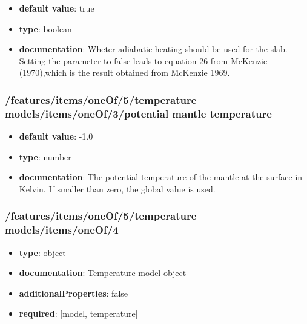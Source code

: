 \begin{itemize}\item {\bf default value}: true
\item {\bf type}: boolean
\item {\bf documentation}: Wheter adiabatic heating should be used for the slab. Setting the parameter to false leads to equation 26 from McKenzie (1970),which is the result obtained from McKenzie 1969.
\end{itemize}\subsubsection{/features/items/oneOf/5/temperature models/items/oneOf/3/potential mantle temperature}
\begin{itemize}\item {\bf default value}: -1.0
\item {\bf type}: number
\item {\bf documentation}: The potential temperature of the mantle at the surface in Kelvin. If smaller than zero, the global value is used.
\end{itemize}\subsubsection{/features/items/oneOf/5/temperature models/items/oneOf/4}
\begin{itemize}\item {\bf type}: object
\item {\bf documentation}: Temperature model object
\item {\bf additionalProperties}: false
\item {\bf required}: [model, temperature]\end{itemize}
